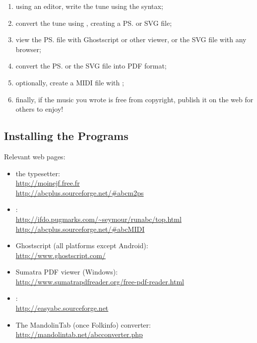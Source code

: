 \documentclass[a4paper,12pt]{book}
\begin{document}
\begin{enumerate}
  
  \item using an editor, write the tune using the \ABC{} syntax;
  
  \item convert the tune using \abcm{}, creating a \ps{} or SVG file;
  
  \item view the \ps{} file with Ghostscript or other viewer, or the
  SVG file with any browser;
  
  \item convert the \ps{} or the SVG file into PDF format;
  
  \item optionally, create a MIDI file with \abcmid;
  
  \item finally, if the music you wrote is free from copyright, publish
  it on the web for others to enjoy!
  
\end{enumerate}


\subsection{Installing the Programs}

Relevant web pages:

\begin{itemize}
  
  \item the \abcm{} typesetter:\\
  \url{http://moinejf.free.fr}\\
  \url{http://abcplus.sourceforge.net/#abcm2ps}

  \item \abcmid:\\
  \url{http://ifdo.pugmarks.com/~seymour/runabc/top.html}\\
  \url{http://abcplus.sourceforge.net/#abcMIDI}

  \item Ghostscript (all platforms except Android):\\
  \url{http://www.ghostscript.com/}
  
  \item Sumatra PDF viewer (Windows):\\
  \url{http://www.sumatrapdfreader.org/free-pdf-reader.html}
  
  \item \easyabc:\\
  \url{http://easyabc.sourceforge.net}
  
  \item The MandolinTab (once Folkinfo) converter:\\
  \url{http://mandolintab.net/abcconverter.php}
  
\end{itemize}
\end{document}
